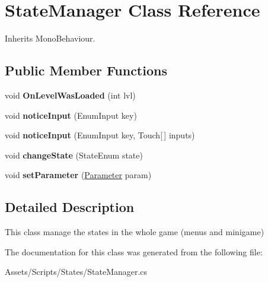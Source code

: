\hypertarget{class_state_manager}{\section{State\-Manager Class Reference}
\label{class_state_manager}
}


Inherits Mono\-Behaviour.

\subsection*{Public Member Functions}
\begin{DoxyCompactItemize}
\item 
\hypertarget{class_state_manager_abc8c2105ba44568f45c8f59c3fa4e950}{void {\bfseries On\-Level\-Was\-Loaded} (int lvl)}\label{class_state_manager_abc8c2105ba44568f45c8f59c3fa4e950}

\item 
\hypertarget{class_state_manager_af1af16b45e791c4503a79ba18f9c1d41}{void {\bfseries notice\-Input} (Enum\-Input key)}\label{class_state_manager_af1af16b45e791c4503a79ba18f9c1d41}

\item 
\hypertarget{class_state_manager_abb6cea56ef538636df4297d4bd2370d9}{void {\bfseries notice\-Input} (Enum\-Input key, Touch\mbox{[}$\,$\mbox{]} inputs)}\label{class_state_manager_abb6cea56ef538636df4297d4bd2370d9}

\item 
\hypertarget{class_state_manager_a17682ddfc6e2e29538cc973686bbd85e}{void {\bfseries change\-State} (State\-Enum state)}\label{class_state_manager_a17682ddfc6e2e29538cc973686bbd85e}

\item 
\hypertarget{class_state_manager_aeaf24e5e1ee3581f1d00da490544649c}{void {\bfseries set\-Parameter} (\hyperlink{class_parameter}{Parameter} param)}\label{class_state_manager_aeaf24e5e1ee3581f1d00da490544649c}

\end{DoxyCompactItemize}


\subsection{Detailed Description}
This class manage the states in the whole game (menus and minigame) 

The documentation for this class was generated from the following file\-:\begin{DoxyCompactItemize}
\item 
Assets/\-Scripts/\-States/State\-Manager.\-cs\end{DoxyCompactItemize}
